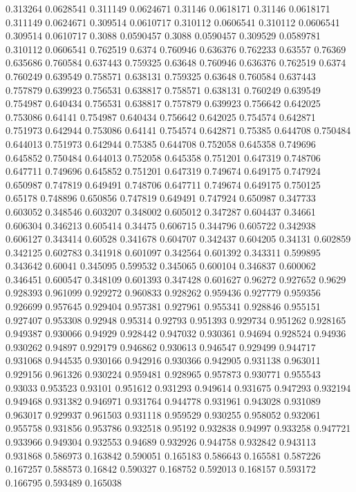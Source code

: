 0.313264 0.0628541
0.311149 0.0624671
0.31146 0.0618171
0.31146 0.0618171
0.311149 0.0624671
0.309514 0.0610717
0.310112 0.0606541
0.310112 0.0606541
0.309514 0.0610717
0.3088 0.0590457
0.3088 0.0590457
0.309529 0.0589781
0.310112 0.0606541
0.762519 0.6374
0.760946 0.636376
0.762233 0.63557
0.76369 0.635686
0.760584 0.637443
0.759325 0.63648
0.760946 0.636376
0.762519 0.6374
0.760249 0.639549
0.758571 0.638131
0.759325 0.63648
0.760584 0.637443
0.757879 0.639923
0.756531 0.638817
0.758571 0.638131
0.760249 0.639549
0.754987 0.640434
0.756531 0.638817
0.757879 0.639923
0.756642 0.642025
0.753086 0.64141
0.754987 0.640434
0.756642 0.642025
0.754574 0.642871
0.751973 0.642944
0.753086 0.64141
0.754574 0.642871
0.75385 0.644708
0.750484 0.644013
0.751973 0.642944
0.75385 0.644708
0.752058 0.645358
0.749696 0.645852
0.750484 0.644013
0.752058 0.645358
0.751201 0.647319
0.748706 0.647711
0.749696 0.645852
0.751201 0.647319
0.749674 0.649175
0.747924 0.650987
0.747819 0.649491
0.748706 0.647711
0.749674 0.649175
0.750125 0.65178
0.748896 0.650856
0.747819 0.649491
0.747924 0.650987
0.347733 0.603052
0.348546 0.603207
0.348002 0.605012
0.347287 0.604437
0.34661 0.606304
0.346213 0.605414
0.34475 0.606715
0.344796 0.605722
0.342938 0.606127
0.343414 0.60528
0.341678 0.604707
0.342437 0.604205
0.34131 0.602859
0.342125 0.602783
0.341918 0.601097
0.342564 0.601392
0.343311 0.599895
0.343642 0.60041
0.345095 0.599532
0.345065 0.600104
0.346837 0.600062
0.346451 0.600547
0.348109 0.601393
0.347428 0.601627
0.96272 0.927652
0.9629 0.928393
0.961099 0.929272
0.960833 0.928262
0.959436 0.927779
0.959356 0.926699
0.957645 0.929404
0.957381 0.927961
0.955341 0.928846
0.955151 0.927407
0.953308 0.92948
0.95314 0.92793
0.951393 0.929734
0.951262 0.928165
0.949387 0.930066
0.94929 0.928442
0.947032 0.930361
0.94694 0.928524
0.94936 0.930262
0.94897 0.929179
0.946862 0.930613
0.946547 0.929499
0.944717 0.931068
0.944535 0.930166
0.942916 0.930366
0.942905 0.931138
0.963011 0.929156
0.961326 0.930224
0.959481 0.928965
0.957873 0.930771
0.955543 0.93033
0.953523 0.93101
0.951612 0.931293
0.949614 0.931675
0.947293 0.932194
0.949468 0.931382
0.946971 0.931764
0.944778 0.931961
0.943028 0.931089
0.963017 0.929937
0.961503 0.931118
0.959529 0.930255
0.958052 0.932061
0.955758 0.931856
0.953786 0.932518
0.95192 0.932838
0.94997 0.933258
0.947721 0.933966
0.949304 0.932553
0.94689 0.932926
0.944758 0.932842
0.943113 0.931868
0.586973 0.163842
0.590051 0.165183
0.586643 0.165581
0.587226 0.167257
0.588573 0.16842
0.590327 0.168752
0.592013 0.168157
0.593172 0.166795
0.593489 0.165038
